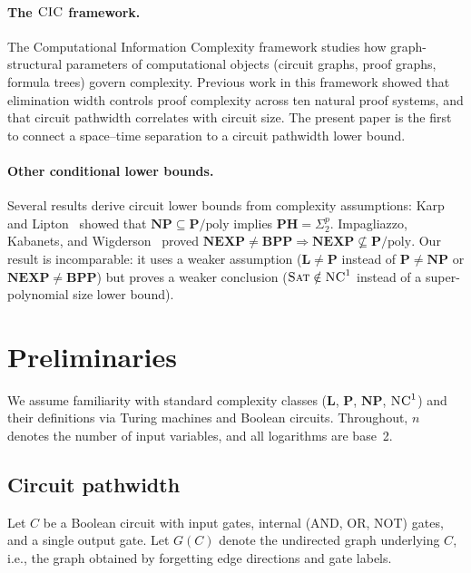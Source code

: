 \documentclass[11pt]{article}
\newcommand{\SAT}{\textsc{Sat}}
\newcommand{\CIC}{\textsc{CIC}}
\newcommand{\poly}{\mathrm{poly}}
\newcommand{\NC}{\textsc{NC}}
\begin{document}
\paragraph{The $\CIC$ framework.}  The Computational Information Complexity
framework \cite{CIC} studies how graph-structural parameters of computational
objects (circuit graphs, proof graphs, formula trees) govern complexity.
Previous work in this framework showed that elimination width controls proof
complexity across ten natural proof systems, and that circuit pathwidth
correlates with circuit size.  The present paper is the first to connect a
space--time separation to a circuit pathwidth lower bound.

\paragraph{Other conditional lower bounds.}  Several results derive circuit
lower bounds from complexity assumptions:
Karp and Lipton~\cite{KL80} showed that $\mathbf{NP} \subseteq \mathbf{P}/\poly$
implies $\mathbf{PH} = \Sigma^p_2$.
Impagliazzo, Kabanets, and Wigderson~\cite{IKW02} proved
$\mathbf{NEXP} \neq \mathbf{BPP} \Rightarrow \mathbf{NEXP} \not\subseteq
\mathbf{P}/\poly$.
Our result is incomparable: it uses a weaker assumption
($\mathbf{L} \neq \mathbf{P}$ instead of $\mathbf{P} \neq \mathbf{NP}$ or
$\mathbf{NEXP} \neq \mathbf{BPP}$) but proves a weaker conclusion
($\SAT \notin \NC^1$ instead of a super-polynomial size lower bound).

\section{Preliminaries}

We assume familiarity with standard complexity classes ($\mathbf{L}$,
$\mathbf{P}$, $\mathbf{NP}$, $\NC^1$) and their definitions via Turing
machines and Boolean circuits.  Throughout, $n$ denotes the number of input
variables, and all logarithms are base~2.

\subsection{Circuit pathwidth}

Let $C$ be a Boolean circuit with input gates, internal (AND, OR, NOT) gates,
and a single output gate.  Let $G(C)$ denote the undirected graph underlying
$C$, i.e., the graph obtained by forgetting edge directions and gate labels.
\end{document}
